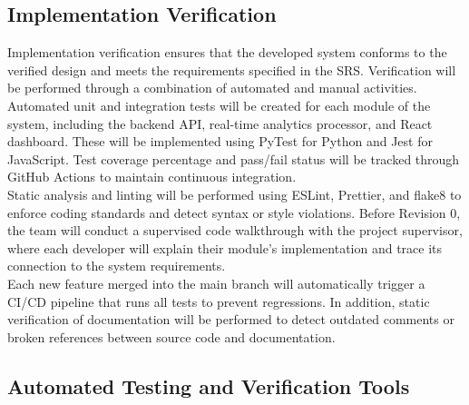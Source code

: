 \documentclass[12pt, titlepage]{article}
\begin{document}



\subsection{Implementation Verification}

Implementation verification ensures that the developed system conforms to the verified design and meets the requirements specified in the SRS. Verification will be performed through a combination of automated and manual activities. \\

Automated unit and integration tests will be created for each module of the system, including the backend API, real-time analytics processor, and React dashboard. These will be implemented using PyTest for Python and Jest for JavaScript. Test coverage percentage and pass/fail status will be tracked through GitHub Actions to maintain continuous integration. \\

Static analysis and linting will be performed using ESLint, Prettier, and flake8 to enforce coding standards and detect syntax or style violations. Before Revision 0, the team will conduct a supervised code walkthrough with the project supervisor, where each developer will explain their module’s implementation and trace its connection to the system requirements. \\

Each new feature merged into the main branch will automatically trigger a CI/CD pipeline that runs all tests to prevent regressions. In addition, static verification of documentation will be performed to detect outdated comments or broken references between source code and documentation.

\subsection{Automated Testing and Verification Tools}

\end{document}
